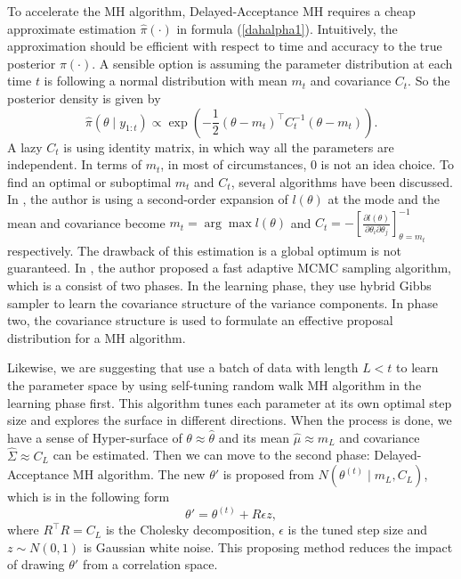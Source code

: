 To accelerate the MH algorithm, Delayed-Acceptance MH requires a cheap approximate estimation $\hat{\pi}(\cdot)$ in formula (\ref{dahalpha1}). Intuitively, the approximation should be efficient with respect to time and accuracy to the true posterior $\pi(\cdot)$. A sensible option is assuming the parameter distribution at each time $t$ is following a normal distribution with mean $m_t$ and covariance $C_t$. So the posterior density is given by 
\begin{equation*}
\hat{\pi}(\theta\mid y_{1:t}) \propto \exp\left( -\frac{1}{2}(\theta-m_t)^\top C_t^{-1}(\theta-m_t)\right). 
\end{equation*}
A lazy $C_t$ is using identity matrix, in which way all the parameters are independent. In terms of $m_t$, in most of circumstances, 0 is not an idea choice. To find an optimal or suboptimal $m_t$ and $C_t$, several algorithms have been discussed. In \cite{stroud2016bayesian}, the author is using a second-order expansion of $l(\theta)$ at the mode and the mean and covariance become $m_t=\arg \max l(\theta)$ and $C_t = - \left[ \frac{\partial l(\theta)}{\partial \theta_i \partial \theta_j} \right]_{\theta=m_t}^{-1}$ respectively. The drawback of this estimation is a global optimum is not guaranteed. In \cite{mathew2012bayesian}, the author proposed a fast adaptive MCMC sampling algorithm, which is a consist of two phases. In the learning phase, they use hybrid Gibbs sampler to learn the covariance structure of the variance components. In phase two, the covariance structure is used to formulate an effective proposal distribution for a MH algorithm. 


Likewise, we are suggesting that use a batch of data with length $L<t$ to learn the parameter space by using self-tuning random walk MH algorithm in the learning phase first. This algorithm tunes each parameter at its own optimal step size and explores the surface in different directions. When the process is done, we have a sense of Hyper-surface of $\theta\approx\hat{\theta}$ and its mean $\hat{\mu}\approx m_L$ and covariance $\hat{\Sigma}\approx C_L$ can be estimated. Then we can move to the second phase: Delayed-Acceptance MH algorithm. The new $\theta'$ is proposed from  $N(\theta^{(t)}\mid m_L,C_L)$, which is in the following form 
\begin{equation}
\theta' = \theta^{(t)} + R\epsilon z,
\end{equation}
where $R^\top R = C_L$ is the Cholesky decomposition, $\epsilon$ is the tuned step size and $z\sim N(0,1)$ is Gaussian white noise. This proposing method reduces the impact of drawing $\theta'$ from a correlation space. 


